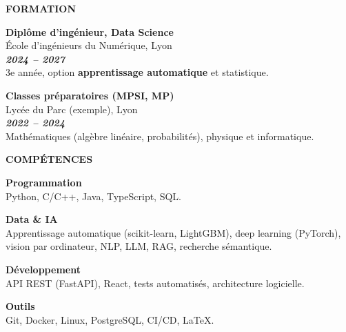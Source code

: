 \documentclass[10pt,a4paper]{article}
\newcommand{\rubrique}[2][12pt plus 2fil]{%
  \par\vspace{#1}%
  {\fontsize{13}{15.5}\selectfont \textbf{\color{cvprimary}#2}\par}%
  \vspace{2pt}{\color{cvprimary}\hrule height 0.4pt}\vspace{7pt}}
\newcommand{\entre}{\par\vspace{7pt plus 1fil}}
\newcommand{\petitentre}{\par\vspace{5pt plus 0.5fil}}
\newlength{\hauteurcol}
\begin{document}
\par\setlength{\hauteurcol}{\dimexpr\pagegoal-\pagetotal-\baselineskip-4pt\relax}
\noindent
\begin{minipage}[t][\hauteurcol][s]{0.41\textwidth}
\raggedright
%

\rubrique[0pt]{FORMATION}

\textbf{Diplôme d'ingénieur, Data Science}\\
École d'ingénieurs du Numérique, Lyon\\
\textbf{\textit{2024 – 2027}}\\
3e année, option \textbf{apprentissage automatique} et statistique.

\entre
\textbf{Classes préparatoires (MPSI, MP)}\\
Lycée du Parc (exemple), Lyon\\
\textbf{\textit{2022 – 2024}}\\
Mathématiques (algèbre linéaire, probabilités), physique et informatique.


\rubrique{COMPÉTENCES}

\textbf{Programmation}\\
Python, C/C++, Java, TypeScript, SQL.

\petitentre
\textbf{Data \& IA}\\
Apprentissage automatique (scikit-learn, LightGBM), deep learning (PyTorch), vision par ordinateur, NLP, LLM, RAG, recherche sémantique.

\petitentre
\textbf{Développement}\\
API REST (FastAPI), React, tests automatisés, architecture logicielle.

\petitentre
\textbf{Outils}\\
Git, Docker, Linux, PostgreSQL, CI/CD, LaTeX.



\end{minipage}
\end{document}
